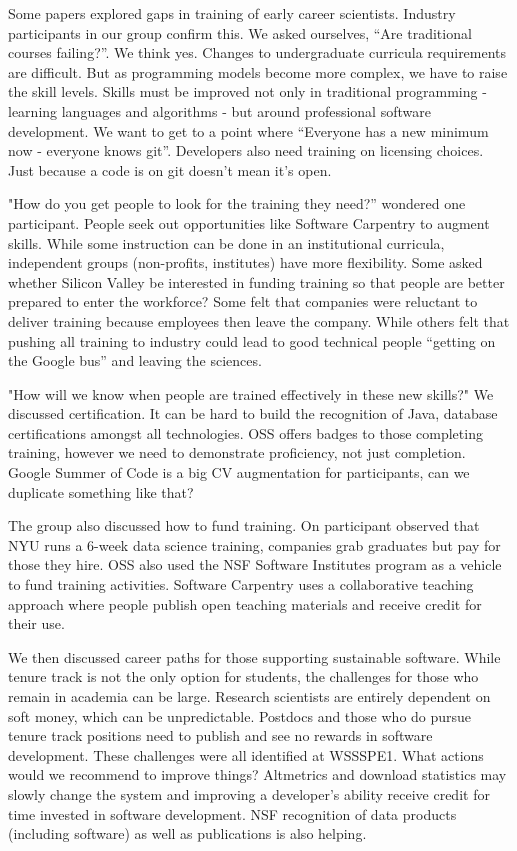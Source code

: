 \documentclass[11pt, oneside]{amsart}
\begin{document}
Some papers explored gaps in training of early career scientists. Industry
participants in our group confirm this. We asked ourselves, ``Are
traditional courses failing?''. We think yes. Changes to undergraduate
curricula requirements are difficult. But as programming models become
more complex, we have to raise the skill levels. Skills must be improved
not only in traditional programming - learning languages and algorithms -
but around professional software development. We want to get to a point
where ``Everyone has a new minimum now - everyone knows git''. Developers
also need training on licensing choices. Just because a code is on git
doesn't mean it's open.

"How do you get people to look for the training they need?'' wondered one
participant. People seek out opportunities like Software Carpentry to
augment skills. While some instruction can be done in an institutional
curricula, independent groups (non-profits, institutes) have more
flexibility. Some asked whether Silicon Valley be interested in funding
training so that people are better prepared to enter the workforce? Some
felt that companies were reluctant to deliver training because employees
then leave the company. While others felt that pushing all training to
industry could lead to good technical people ``getting on the Google bus''
and leaving the sciences.

"How will we know when people are trained effectively in these new
skills?" We discussed certification. It can be hard to build the
recognition of Java, database certifications amongst all technologies. OSS
offers badges to those completing training, however we need to demonstrate
proficiency, not just completion. Google Summer of Code is a big CV
augmentation for participants, can we duplicate something like that?

The group also discussed how to fund training. On participant observed
that NYU runs a 6-week data science training, companies grab graduates but
pay for those they hire. OSS also used the NSF Software Institutes program
as a vehicle to fund training activities. Software Carpentry uses a
collaborative teaching approach where  people publish open teaching
materials and receive credit for their use.


We then discussed career paths for those supporting sustainable software.
While tenure track is not the only option for students, the challenges for
those who remain in academia can be large. Research scientists are
entirely dependent on soft money, which can be unpredictable. Postdocs and
those who do pursue tenure track positions need to publish and see no
rewards in software development. These challenges were all identified at
WSSSPE1. What actions would we recommend to improve things? Altmetrics and
download statistics may slowly change the system and improving a
developer's ability receive credit for time invested in software
development. NSF recognition of data products (including software) as well
as publications is also helping.
\end{document}

